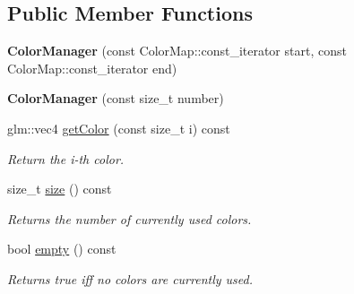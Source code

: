\subsection*{Public Member Functions}
\begin{DoxyCompactItemize}
\item 
\mbox{\label{classpepr3d_1_1_color_manager_a224a83a4fd10df768ce5463366992fa9}} 
{\bfseries Color\+Manager} (const Color\+Map\+::const\+\_\+iterator start, const Color\+Map\+::const\+\_\+iterator end)
\item 
\mbox{\label{classpepr3d_1_1_color_manager_a50c0362e45843f826984b86b4f5f7bf3}} 
{\bfseries Color\+Manager} (const size\+\_\+t number)
\item 
\mbox{\label{classpepr3d_1_1_color_manager_aa6453cf533bb4bb251203bd599c48321}} 
glm\+::vec4 \mbox{\hyperlink{classpepr3d_1_1_color_manager_aa6453cf533bb4bb251203bd599c48321}{get\+Color}} (const size\+\_\+t i) const
\begin{DoxyCompactList}\small\item\em Return the i-\/th color. \end{DoxyCompactList}\item 
\mbox{\label{classpepr3d_1_1_color_manager_a136ee5ee62632d6537377fccdc5ef9c6}} 
size\+\_\+t \mbox{\hyperlink{classpepr3d_1_1_color_manager_a136ee5ee62632d6537377fccdc5ef9c6}{size}} () const
\begin{DoxyCompactList}\small\item\em Returns the number of currently used colors. \end{DoxyCompactList}\item 
\mbox{\label{classpepr3d_1_1_color_manager_a439df566020a7f10221a4e4c3fd36e7d}} 
bool \mbox{\hyperlink{classpepr3d_1_1_color_manager_a439df566020a7f10221a4e4c3fd36e7d}{empty}} () const
\begin{DoxyCompactList}\small\item\em Returns true iff no colors are currently used. \end{DoxyCompactList}\item 
\mbox{\label{classpepr3d_1_1_color_manager_adb8aeb957d6a1cd5a79ebc0e246f5ca7}} 

\end{DoxyCompactItemize}

